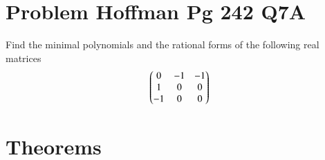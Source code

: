\documentclass[journal,12pt]{IEEEtran}
\begin{document}
\renewcommand{\thefigure}{\theenumi}
\renewcommand{\thetable}{\theenumi}

\section{\textbf{Problem Hoffman Pg 242 Q7A}}
 Find the minimal polynomials and the rational forms of  the following real matrices\\
 
\begin{align}
    \begin{pmatrix}0&-1&-1\\1&0&0\\-1&0&0\end{pmatrix}
\end{align}
 
\section{\textbf{Theorems}}
\renewcommand{\thetable}{1}
\end{document}
